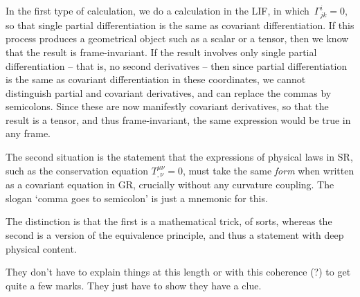 \documentclass{exam-n}  %
\begin{document}
\begin{question}{20}
\begin{solution}
  In the first type of calculation, we do a calculation in the LIF, in
which~$\Gamma^i_{jk}=0$, so that single partial differentiation is the
same as covariant differentiation.  If this process produces a
geometrical object such as a scalar or a tensor, then we know that the
result is frame-invariant.  If the result involves only single partial
differentiation -- that is, no second derivatives -- then since
partial differentiation is the same as covariant differentiation in
these coordinates, we cannot distinguish partial and covariant
derivatives, and can replace the commas by semicolons.  Since these
are now manifestly covariant derivatives, so that the result is a
tensor, and thus frame-invariant, the same expression would be true in
any frame.

The second situation is the statement that the expressions of physical
laws in SR, such as the conservation equation
$T^{\mu\nu}_{,\nu}=0$, must take the same \emph{form} when written
as a covariant equation in GR, crucially without any curvature
coupling.  The slogan `comma goes to semicolon' is just a mnemonic for
this.

The distinction is that the first is a mathematical trick, of sorts,
whereas the second is a version of the equivalence principle, and thus
a statement with deep physical content.

They don't have to explain things at this length or with this
coherence (?) to get quite a few marks.  They just have to show they
have a clue.
\end{solution}
\end{question}
\end{document}
